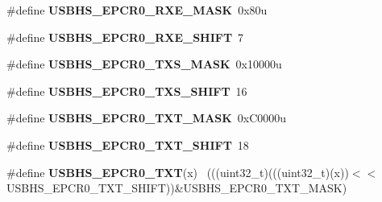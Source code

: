 \begin{DoxyCompactItemize}
\item 
\hypertarget{group___u_s_b_h_s___register___masks_ga4f63004a411b3e140d7813f19abbaeea}{}\#define {\bfseries U\+S\+B\+H\+S\+\_\+\+E\+P\+C\+R0\+\_\+\+R\+X\+E\+\_\+\+M\+A\+S\+K}~0x80u\label{group___u_s_b_h_s___register___masks_ga4f63004a411b3e140d7813f19abbaeea}

\item 
\hypertarget{group___u_s_b_h_s___register___masks_gae42867c725b4b019818aaa4484420914}{}\#define {\bfseries U\+S\+B\+H\+S\+\_\+\+E\+P\+C\+R0\+\_\+\+R\+X\+E\+\_\+\+S\+H\+I\+F\+T}~7\label{group___u_s_b_h_s___register___masks_gae42867c725b4b019818aaa4484420914}

\item 
\hypertarget{group___u_s_b_h_s___register___masks_gaeb880ccedb06b7549278a61c14f57279}{}\#define {\bfseries U\+S\+B\+H\+S\+\_\+\+E\+P\+C\+R0\+\_\+\+T\+X\+S\+\_\+\+M\+A\+S\+K}~0x10000u\label{group___u_s_b_h_s___register___masks_gaeb880ccedb06b7549278a61c14f57279}

\item 
\hypertarget{group___u_s_b_h_s___register___masks_gad8a78e2b2d5b4ff12f0984afdb7ba25d}{}\#define {\bfseries U\+S\+B\+H\+S\+\_\+\+E\+P\+C\+R0\+\_\+\+T\+X\+S\+\_\+\+S\+H\+I\+F\+T}~16\label{group___u_s_b_h_s___register___masks_gad8a78e2b2d5b4ff12f0984afdb7ba25d}

\item 
\hypertarget{group___u_s_b_h_s___register___masks_gad3fa95f7e4cb8610a679ba55c80ea7c6}{}\#define {\bfseries U\+S\+B\+H\+S\+\_\+\+E\+P\+C\+R0\+\_\+\+T\+X\+T\+\_\+\+M\+A\+S\+K}~0x\+C0000u\label{group___u_s_b_h_s___register___masks_gad3fa95f7e4cb8610a679ba55c80ea7c6}

\item 
\hypertarget{group___u_s_b_h_s___register___masks_gada44ef49fe0a35f8b5f362a44e137612}{}\#define {\bfseries U\+S\+B\+H\+S\+\_\+\+E\+P\+C\+R0\+\_\+\+T\+X\+T\+\_\+\+S\+H\+I\+F\+T}~18\label{group___u_s_b_h_s___register___masks_gada44ef49fe0a35f8b5f362a44e137612}

\item 
\hypertarget{group___u_s_b_h_s___register___masks_ga36b6e963c5144c95c56a8c6a05c3b939}{}\#define {\bfseries U\+S\+B\+H\+S\+\_\+\+E\+P\+C\+R0\+\_\+\+T\+X\+T}(x)                                          ~(((uint32\+\_\+t)(((uint32\+\_\+t)(x))$<$$<$U\+S\+B\+H\+S\+\_\+\+E\+P\+C\+R0\+\_\+\+T\+X\+T\+\_\+\+S\+H\+I\+F\+T))\&U\+S\+B\+H\+S\+\_\+\+E\+P\+C\+R0\+\_\+\+T\+X\+T\+\_\+\+M\+A\+S\+K)\label{group___u_s_b_h_s___register___masks_ga36b6e963c5144c95c56a8c6a05c3b939}


\end{DoxyCompactItemize}
